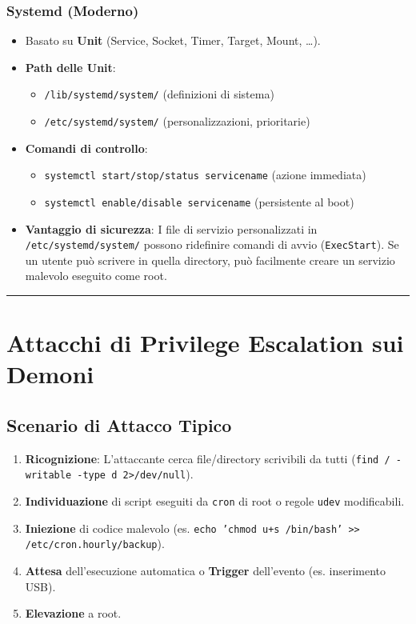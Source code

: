 \documentclass[12pt, a4paper]{report}
\begin{document}
\subsubsection{Systemd (Moderno)}
\begin{itemize}
	\item Basato su \textbf{Unit} (Service, Socket, Timer, Target, Mount, \dots).
	\item \textbf{Path delle Unit}:
	\begin{itemize}
		\item \texttt{/lib/systemd/system/} (definizioni di sistema)
		\item \texttt{/etc/systemd/system/} (personalizzazioni, prioritarie)
	\end{itemize}
	\item \textbf{Comandi di controllo}:
	\begin{itemize}
		\item \texttt{systemctl start/stop/status servicename} (azione immediata)
		\item \texttt{systemctl enable/disable servicename} (persistente al boot)
	\end{itemize}
	\item \textbf{Vantaggio di sicurezza}: I file di servizio personalizzati in \texttt{/etc/systemd/system/} possono ridefinire comandi di avvio (\texttt{ExecStart}). Se un utente può scrivere in quella directory, può facilmente creare un servizio malevolo eseguito come root.
\end{itemize}

\noindent\rule{\textwidth}{0.4pt}

\section{Attacchi di Privilege Escalation sui Demoni}

\subsection{Scenario di Attacco Tipico}
\begin{enumerate}
	\item \textbf{Ricognizione}: L'attaccante cerca file/directory scrivibili da tutti (\texttt{find / -writable -type d 2>/dev/null}).
	\item \textbf{Individuazione} di script eseguiti da \texttt{cron} di root o regole \texttt{udev} modificabili.
	\item \textbf{Iniezione} di codice malevolo (es. \texttt{echo 'chmod u+s /bin/bash' >> /etc/cron.hourly/backup}).
	\item \textbf{Attesa} dell'esecuzione automatica o \textbf{Trigger} dell'evento (es. inserimento USB).
	\item \textbf{Elevazione} a root.
\end{enumerate}
\end{document}

